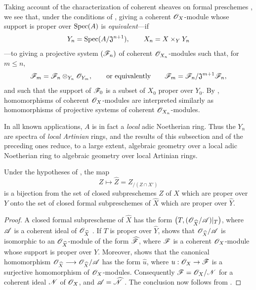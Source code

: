 \begin{scholium}[5.1.7]
\label{III.5.1.7}
Taking account of the characterization of coherent sheaves on
formal preschemes , we see that, under the
conditions of , giving a coherent
$\mathscr{O}_X$-module whose support is proper over $\operatorname{Spec}(A)$ is
\emph{equivalent}---if
\[
  Y_n=\operatorname{Spec}(A/\mathfrak{J}^{n+1}),\qquad
  X_n=X\times_Y Y_n
\]
---to giving a projective system $(\mathscr{F}_n)$ of coherent
$\mathscr{O}_{X_n}$-modules such that, for $m\leq n$,
\[
  \mathscr{F}_m
  =
  \mathscr{F}_n\otimes_{Y_n}\mathscr{O}_{Y_m},
  \qquad\text{or equivalently}\qquad
  \mathscr{F}_m
  =
  \mathscr{F}_n/\mathfrak{J}^{m+1}\mathscr{F}_n,
\]
and such that the support of $\mathscr{F}_0$ is a subset of $X_0$
proper over $Y_0$.  By , homomorphisms of
coherent $\mathscr{O}_X$-modules are interpreted similarly as
homomorphisms of projective systems of coherent
$\mathscr{O}_{X_n}$-modules.


In all known applications, $A$ is in fact a \emph{local} adic Noetherian
ring.  Thus the $Y_n$ are spectra of \emph{local Artinian} rings, and the
results of this subsection and of the preceding ones reduce, to a
large extent, algebraic geometry over a local adic Noetherian ring
to algebraic geometry over local Artinian rings.
\end{scholium}

\begin{corollary}[5.1.8]
\label{III.5.1.8}
Under the hypotheses of , the map
\[
  Z\longmapsto\widehat{Z}=Z_{/(Z\cap X')}
\]
is a bijection from the set of closed subpreschemes $Z$ of $X$
which are proper over $Y$ onto the set of closed formal
subpreschemes of $\widehat{X}$ which are proper over
$\widehat{Y}$.
\end{corollary}

\begin{proof}
A closed formal subprescheme of $\widehat{X}$ has the form $\bigl(T,
(\mathscr{O}_{\widehat{X}}/\mathscr{A})|_T\bigr)$,
where $\mathscr{A}$ is a coherent ideal of
$\mathscr{O}_{\widehat{X}}$ .  If $T$ is proper over
$\widehat{Y}$,  shows that
$\mathscr{O}_{\widehat{X}}/\mathscr{A}$ is isomorphic to an
$\mathscr{O}_{\widehat{X}}$-module of the form
$\widehat{\mathscr{F}}$, where $\mathscr{F}$ is a coherent
$\mathscr{O}_X$-module whose support is proper over $Y$.  Moreover,
 shows that the canonical homomorphism $\mathscr{O}_{\widehat{X}}
\longrightarrow
\mathscr{O}_{\widehat{X}}/\mathscr{A}$
has the form $\widehat{u}$, where
$u:\mathscr{O}_X\to\mathscr{F}$ is a surjective homomorphism of
$\mathscr{O}_X$-modules.  Consequently
$\mathscr{F}=\mathscr{O}_X/\mathscr{N}$ for a coherent ideal $\mathscr{N}$ of
$\mathscr{O}_X$, and
$\mathscr{A}=\widehat{\mathscr{N}}$ .  The conclusion now
follows from .
\end{proof}


